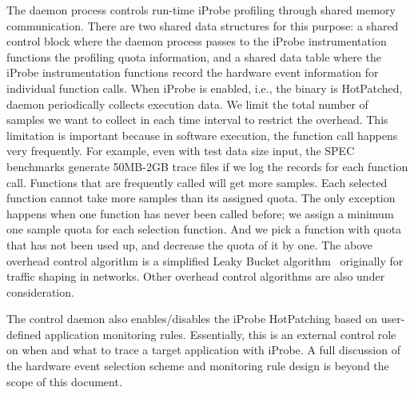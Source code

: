 The daemon process controls run-time iProbe profiling through shared memory communication.  
There are two shared data structures for this purpose: a shared control block where the daemon process passes to the iProbe instrumentation functions the profiling quota information, and a shared data table where the iProbe instrumentation functions record the hardware event information for individual function calls. 
When iProbe is enabled, i.e., the binary is HotPatched, daemon periodically collects execution data. 
We limit the total number of samples we want to collect in each time interval to restrict the overhead.  
This limitation is important because in software execution, the function call happens very frequently. 
For example, even with test data size input, the SPEC benchmarks generate 50MB-2GB trace files if we log the records for each function call. 
Functions that are frequently called will get more samples. 
Each selected function cannot take more samples than its assigned quota. 
The only exception happens when one function has never been called before; we assign a minimum one sample quota for each selection function. 
And we pick a function with quota that has not been used up, and decrease the quota of it by one. 
The above overhead control algorithm is a simplified Leaky Bucket algorithm~\cite{lba} originally for traffic shaping in networks. Other overhead control algorithms are also under consideration.

The control daemon also enables/disables the iProbe HotPatching based on user-defined application monitoring rules.
Essentially, this is an external control role on when and what to trace a target application with iProbe.
A full discussion of the hardware event selection scheme and monitoring rule design is beyond the scope of this document. 
